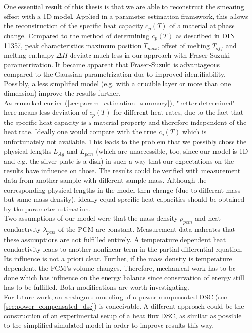 \documentclass{scrartcl}[12pt, halfparskip]
\numberwithin{equation}{section}
\numberwithin{figure}{section}
\numberwithin{table}{section}
\begin{document}
One essential result of this thesis is that we are able to reconstruct the smearing effect with a 1D model. Applied in a parameter estimation framework, this allows the reconstruction of the specific heat capacity $c_p(T)$ of a material at phase change. Compared to the method of determining $c_p(T)$ as described in DIN 11357, peak characteristics maximum position $T_{max}$, offset of melting $T_{off}$ and melting enthalpy $\Delta H$ deviate much less in our approach with Fraser-Suzuki parametrization. 
It became apparent that Fraser-Suzuki is advantageous compared to the Gaussian parametrization due to improved identifiability.
Possibly, a less simplified model (e.g. with a crucible layer or more than one dimension) improve the results further. \\
As remarked earlier (\cref{sec:param_estimation_summary}), "better determined" here means less deviation of $c_p(T)$ for different heat rates, due to the fact that the specific heat capacity is a material property and therefore independent of the heat rate. 
Ideally one would compare with the true $c_p(T)$ which is unfortunately not available. 
This leads to the problem that we possibly chose the physical lengths $L_{Ag}$ and $L_{pcm}$ (which are unaccessible, too, since our model is 1D and e.g. the silver plate is a disk) in such a way that our expectations on the results have influence on those. 
The results could be verified  with measurement data from another sample with different sample mass. Although the corresponding physical lengths in the model then change (due to different mass but same mass density), ideally equal specific heat capacities should be obtained by the parameter estimation. \\
Two assumptions of our model were that the mass density $\rho_{pcm}$ and heat conductivity $\lambda_{pcm}$ of the PCM are constant. 
Measurement data indicates that these assumptions are not fulfilled entirely. 
A temperature dependent heat conductivity leads to another nonlinear term in the partial differential equation. 
Its influence is not a priori clear. 
Further, if the mass density is temperature dependent, the PCM's volume changes. 
Therefore, mechanical work has to be done which has influence on the energy balance since conservation of energy still has to be fulfilled. 
Both modifications are worth investigating. \\
For future work, an analogous modeling of a power compensated DSC (see \cref{sec:power_compensated_dsc}) is conceivable. 
A different approach could be the construction of an experimental setup of a heat flux DSC, as similar as possible to the simplified simulated model in order to improve results this way. \\
\end{document}
